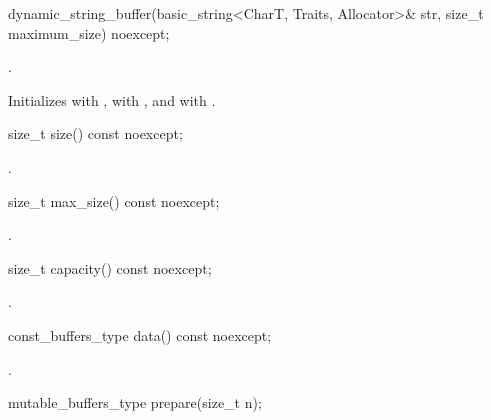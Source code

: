 %
\begin{itemdecl}
dynamic_string_buffer(basic_string<CharT, Traits, Allocator>& str,
                      size_t maximum_size) noexcept;
\end{itemdecl}

\begin{itemdescr}
\pnum
\changed{\requires}{\expects} .

\pnum
\effects Initializes  with ,  with , and  with .
\end{itemdescr}

%
\begin{itemdecl}
size_t size() const noexcept;
\end{itemdecl}

\begin{itemdescr}
\pnum
\returns {}.
\end{itemdescr}

%
\begin{itemdecl}
size_t max_size() const noexcept;
\end{itemdecl}

\begin{itemdescr}
\pnum
\returns {}.
\end{itemdescr}

%
\begin{itemdecl}
size_t capacity() const noexcept;
\end{itemdecl}

\begin{itemdescr}
\pnum
\returns {}.
\end{itemdescr}

%
\begin{itemdecl}
const_buffers_type data() const noexcept;
\end{itemdecl}

\begin{itemdescr}
\pnum
\returns {}.
\end{itemdescr}

%
\begin{itemdecl}
mutable_buffers_type prepare(size_t n);
\end{itemdecl}


